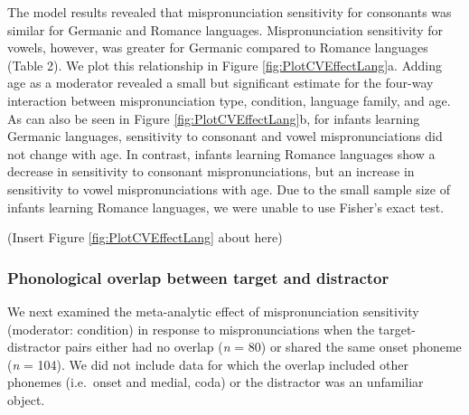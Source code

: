 \documentclass[
  english,
  man, noextraspace]{apa6}
\begin{document}
The model results revealed that mispronunciation sensitivity for consonants was similar for Germanic and Romance languages. Mispronunciation sensitivity for vowels, however, was greater for Germanic compared to Romance languages (Table 2). We plot this relationship in Figure \ref{fig:PlotCVEffectLang}a. Adding age as a moderator revealed a small but significant estimate for the four-way interaction between mispronunciation type, condition, language family, and age. As can also be seen in Figure \ref{fig:PlotCVEffectLang}b, for infants learning Germanic languages, sensitivity to consonant and vowel mispronunciations did not change with age. In contrast, infants learning Romance languages show a decrease in sensitivity to consonant mispronunciations, but an increase in sensitivity to vowel mispronunciations with age. Due to the small sample size of infants learning Romance languages, we were unable to use Fisher's exact test.

(Insert Figure \ref{fig:PlotCVEffectLang} about here)

\hypertarget{phonological-overlap-between-target-and-distractor}{%
\subsubsection{Phonological overlap between target and distractor}\label{phonological-overlap-between-target-and-distractor}}

We next examined the meta-analytic effect of mispronunciation sensitivity (moderator: condition) in response to mispronunciations when the target-distractor pairs either had no overlap (\emph{n} = 80) or shared the same onset phoneme (\emph{n} = 104). We did not include data for which the overlap included other phonemes (i.e.~onset and medial, coda) or the distractor was an unfamiliar object.
\end{document}
